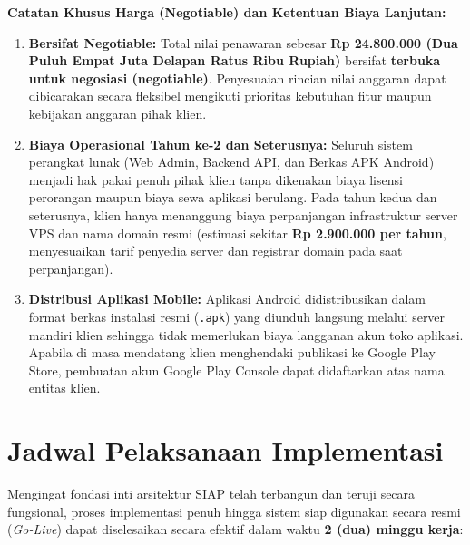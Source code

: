 \documentclass[11pt,a4paper]{article}
\begin{document}
\begin{framed}
    \small
    \textbf{Catatan Khusus Harga (Negotiable) dan Ketentuan Biaya Lanjutan:}
    \begin{enumerate}
        \item \textbf{Bersifat Negotiable:} Total nilai penawaran sebesar \textbf{Rp 24.800.000 (Dua Puluh Empat Juta Delapan Ratus Ribu Rupiah)} bersifat \textbf{terbuka untuk negosiasi (negotiable)}. Penyesuaian rincian nilai anggaran dapat dibicarakan secara fleksibel mengikuti prioritas kebutuhan fitur maupun kebijakan anggaran pihak klien.
        \item \textbf{Biaya Operasional Tahun ke-2 dan Seterusnya:} Seluruh sistem perangkat lunak (Web Admin, Backend API, dan Berkas APK Android) menjadi hak pakai penuh pihak klien tanpa dikenakan biaya lisensi perorangan maupun biaya sewa aplikasi berulang. Pada tahun kedua dan seterusnya, klien hanya menanggung biaya perpanjangan infrastruktur server VPS dan nama domain resmi (estimasi sekitar \textbf{Rp 2.900.000 per tahun}, menyesuaikan tarif penyedia server dan registrar domain pada saat perpanjangan).
        \item \textbf{Distribusi Aplikasi Mobile:} Aplikasi Android didistribusikan dalam format berkas instalasi resmi (\texttt{.apk}) yang diunduh langsung melalui server mandiri klien sehingga tidak memerlukan biaya langganan akun toko aplikasi. Apabila di masa mendatang klien menghendaki publikasi ke Google Play Store, pembuatan akun Google Play Console dapat didaftarkan atas nama entitas klien.
    \end{enumerate}
\end{framed}

\vspace{10pt}
\section{Jadwal Pelaksanaan Implementasi}

Mengingat fondasi inti arsitektur SIAP telah terbangun dan teruji secara fungsional, proses implementasi penuh hingga sistem siap digunakan secara resmi (\textit{Go-Live}) dapat diselesaikan secara efektif dalam waktu \textbf{2 (dua) minggu kerja}:
\end{document}
